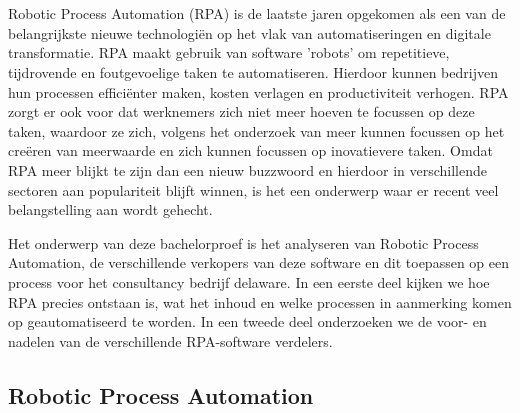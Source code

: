 \chapter{}%
\label{ch:stand-van-zaken}

Robotic Process Automation (RPA) is de laatste jaren opgekomen als een van de belangrijkste nieuwe technologiën op het vlak van automatiseringen en digitale transformatie. RPA maakt gebruik van software 'robots' om repetitieve, tijdrovende en foutgevoelige taken te automatiseren. Hierdoor kunnen bedrijven hun processen efficiënter maken, kosten verlagen en productiviteit verhogen. RPA zorgt er ook voor dat werknemers zich niet meer hoeven te focussen op deze taken, waardoor ze zich, volgens het onderzoek van \textcite{ZalewskaTurzynska2022} meer kunnen focussen op het creëren van meerwaarde en zich kunnen focussen op inovatievere taken. Omdat RPA meer blijkt te zijn dan een nieuw buzzwoord en hierdoor in verschillende sectoren aan populariteit blijft winnen, is het een onderwerp waar er recent veel belangstelling aan wordt gehecht.




Het onderwerp van deze bachelorproef is het analyseren van Robotic Process Automation, de verschillende verkopers van deze software en dit toepassen op een process voor het consultancy bedrijf delaware. In een eerste deel kijken we hoe RPA precies ontstaan is, wat het inhoud en welke processen in aanmerking komen op geautomatiseerd te worden. In een tweede deel onderzoeken we de voor- en nadelen van de verschillende RPA-software verdelers.

\section{Robotic Process Automation}

